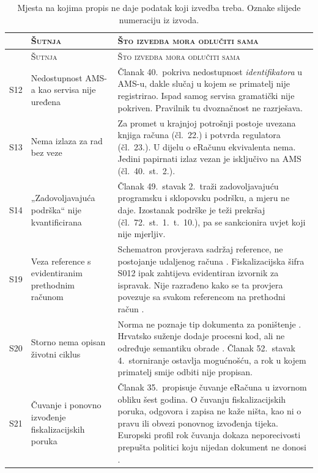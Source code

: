 \begingroup
\small
\setlength{\tabcolsep}{4pt}
\renewcommand{\arraystretch}{1.25}
\begin{longtable}{@{}p{0.9cm}p{5.4cm}p{8.4cm}@{}}
\caption[Preostale šutnje propisa]{Mjesta na kojima propis ne daje podatak koji
izvedba treba. Oznake slijede numeraciju iz izvoda.}
\label{tab:sutnje} \\
\toprule
& \textsc{Šutnja} & \textsc{Što izvedba mora odlučiti sama} \\
\midrule
\endfirsthead
\toprule
& \textsc{Šutnja} & \textsc{Što izvedba mora odlučiti sama} \\
\midrule
\endhead
\bottomrule
\endlastfoot

S12 & Nedostupnost AMS-a kao servisa nije uređena &
Članak 40.\ pokriva nedostupnost \emph{identifikatora} u AMS-u, dakle slučaj u
kojem se primatelj nije registrirao. Ispad samog servisa gramatički nije
pokriven. Pravilnik tu dvoznačnost ne razrješava. \\

S13 & Nema izlaza za rad bez veze &
Za promet u krajnjoj potrošnji postoje uvezana knjiga računa (čl.~22.) i potvrda
regulatora (čl.~23.). U dijelu o eRačunu ekvivalenta nema. Jedini papirnati
izlaz vezan je isključivo na AMS (čl.~40.~st.~2.). \\

S14 & „Zadovoljavajuća podrška“ nije kvantificirana &
Članak 49.\ stavak 2.\ traži zadovoljavajuću programsku i sklopovsku podršku, a
mjeru ne daje. Izostanak podrške je teži prekršaj
(čl.~72.~st.~1.~t.~10.), pa se sankcionira uvjet koji nije mjerljiv. \\

S19 & Veza reference s evidentiranim prethodnim računom &
Schematron provjerava sadržaj reference, ne postojanje udaljenog
računa \cite{cen2026validationartefacts}. Fiskalizacijska šifra S012 ipak
zahtijeva evidentiran izvornik za ispravak. Nije razrađeno kako se ta
provjera povezuje sa svakom referencom na prethodni račun \cite{pu2026tehspec}. \\

S20 & Storno nema opisan životni ciklus &
Norma ne poznaje tip dokumenta za poništenje \cite{cen2019en16931}. Hrvatsko
suženje dodaje procesni kod, ali ne određuje semantiku
obrade \cite{pu2026hrcius}. Članak 52.\ stavak 4.\ storniranje ostavlja
mogućnošću, a rok u kojem primatelj smije odbiti nije propisan. \\

S21 & Čuvanje i ponovno izvođenje fiskalizacijskih poruka &
Članak 35.\ propisuje čuvanje eRačuna u izvornom obliku šest godina. O čuvanju
fiskalizacijskih poruka, odgovora i zapisa ne kaže ništa, kao ni o pravu ili
obvezi ponovnog izvođenja tijeka. Europski profil rok čuvanja dokaza
neporecivosti prepušta politici koju nijedan dokument ne
donosi \cite{cef2020as4v115}. \\


\end{longtable}
